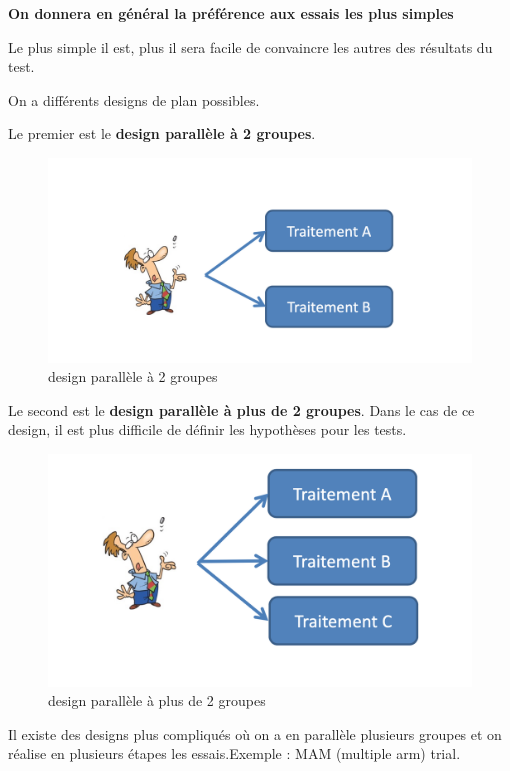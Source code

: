 \begin{center}
    \textbf{ On donnera en général la préférence aux essais les plus simples}
\end{center}
Le plus simple il est, plus il sera facile de convaincre les autres des résultats du test.

On a différents designs de plan possibles.

Le premier est le \textbf{design parallèle à 2 groupes}. 
\begin{figure}[H]
    \centering
    \includegraphics[scale =0.2]{images/2treatments.png}
    \caption{design parallèle à 2 groupes}
    \label{fig:design2}
\end{figure}

Le second est le \textbf{design parallèle à plus de 2 groupes}. Dans le cas de ce design, il est plus difficile de définir les hypothèses pour les tests. 
\begin{figure}[H]
    \centering
    \includegraphics[scale =0.2]{images/more2.png}
    \caption{design parallèle à plus de 2 groupes}
    \label{fig:my_label}
\end{figure}

Il existe des designs plus compliqués où on a en parallèle plusieurs groupes et on réalise en plusieurs étapes les essais.Exemple : MAM (multiple arm) trial.

